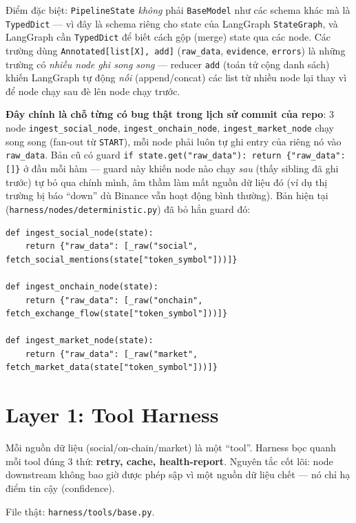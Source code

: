 \documentclass[12pt,a4paper]{article}
\newcommand{\file}[1]{\texttt{#1}}
\begin{document}
Điểm đặc biệt: \texttt{PipelineState} \emph{không} phải \texttt{BaseModel} như các schema khác mà
là \texttt{TypedDict} --- vì đây là schema riêng cho state của LangGraph \texttt{StateGraph}, và
LangGraph cần \texttt{TypedDict} để biết cách gộp (merge) state qua các node. Các trường dùng
\texttt{Annotated[list[X], add]} (\texttt{raw\_data}, \texttt{evidence}, \texttt{errors}) là những
trường có \emph{nhiều node ghi song song} --- reducer \texttt{add} (toán tử cộng danh sách) khiến
LangGraph tự động \emph{nối} (append/concat) các list từ nhiều node lại thay vì để node chạy sau
đè lên node chạy trước.

\textbf{Đây chính là chỗ từng có bug thật trong lịch sử commit của repo}: 3 node
\texttt{ingest\_social\_node}, \texttt{ingest\_onchain\_node}, \texttt{ingest\_market\_node} chạy
song song (fan-out từ \texttt{START}), mỗi node phải luôn tự ghi entry của riêng nó vào
\texttt{raw\_data}. Bản cũ có guard \texttt{if state.get("raw\_data"): return \{"raw\_data": []\}}
ở đầu mỗi hàm --- guard này khiến node nào chạy \emph{sau} (thấy sibling đã ghi trước) tự bỏ qua
chính mình, âm thầm làm mất nguồn dữ liệu đó (ví dụ thị trường bị báo ``down'' dù Binance vẫn hoạt
động bình thường). Bản hiện tại (\file{harness/nodes/deterministic.py}) đã bỏ hẳn guard đó:

\begin{lstlisting}
def ingest_social_node(state):
    return {"raw_data": [_raw("social", fetch_social_mentions(state["token_symbol"]))]}

def ingest_onchain_node(state):
    return {"raw_data": [_raw("onchain", fetch_exchange_flow(state["token_symbol"]))]}

def ingest_market_node(state):
    return {"raw_data": [_raw("market", fetch_market_data(state["token_symbol"]))]}
\end{lstlisting}

\section{Layer 1: Tool Harness}

Mỗi nguồn dữ liệu (social/on-chain/market) là một ``tool''. Harness bọc quanh mỗi tool đúng 3 thứ:
\textbf{retry, cache, health-report}. Nguyên tắc cốt lõi: node downstream không bao giờ được phép
sập vì một nguồn dữ liệu chết --- nó chỉ hạ điểm tin cậy (confidence).

File thật: \file{harness/tools/base.py}.
\end{document}
